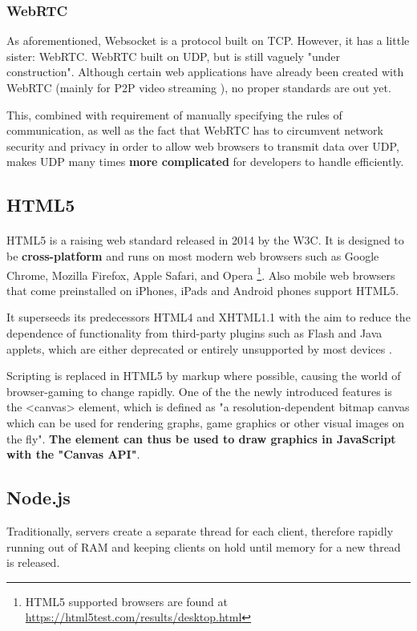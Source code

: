 \documentclass[bsc,frontabs,twoside,singlespacing,parskip,deptreport]{infthesis}     %
\begin{document}
\subsubsection{WebRTC}
As aforementioned, Websocket is a protocol built on TCP. However, it has a little sister: WebRTC. WebRTC built on UDP, but is still vaguely "under construction"\cite{Browser_Networking}. Although certain web applications have already been created with WebRTC (mainly for P2P video streaming \cite{P2P_Video_Streaming_HTML5_WebRTC}), no proper standards are out yet\cite{Web_Apps_Superior}.

This, combined with requirement of manually specifying the rules of communication, as well as the fact that WebRTC has to circumvent network security and privacy in order to allow web browsers to transmit data over UDP\cite{P2P_Video_Streaming_HTML5_WebRTC}, makes UDP many times \textbf{more complicated} for developers to handle efficiently.

\subsection{HTML5}
\paragraph{}HTML5 is a raising web standard released in 2014 by the W3C. It is designed to be \textbf{cross-platform} and runs on most modern web browsers such as Google Chrome, Mozilla Firefox, Apple Safari, and Opera \footnote{HTML5 supported browsers are found at \url{https://html5test.com/results/desktop.html}}. Also mobile web browsers that come preinstalled on iPhones, iPads and Android phones support HTML5.

It superseeds its predecessors HTML4 and XHTML1.1 with the aim to reduce the dependence of functionality from third-party plugins such as Flash and Java applets, which are either deprecated or entirely unsupported by most devices \cite{Death_Flash_Java}.

Scripting is replaced in HTML5 by markup where possible, causing the world of browser-gaming to change rapidly. One of the the newly introduced features is the <canvas> element, which is defined as "a resolution-dependent bitmap canvas which can be used for rendering graphs, game graphics or other visual images on the fly"\cite{HTML5_Up_and_Running}. \textbf{The element can thus be used to draw graphics in JavaScript with the "Canvas API"}\cite{Canvas_API}.

\subsection{Node.js}
Traditionally, servers create a separate thread for each client, therefore rapidly running out of RAM and keeping clients on hold until memory for a new thread is released\cite{Why_Nodejs}.
\end{document}
